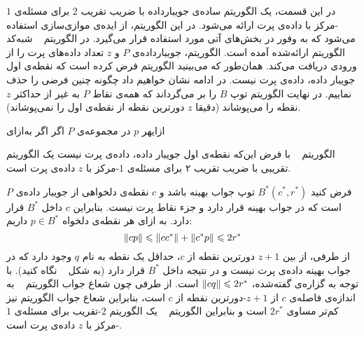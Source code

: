 
در این قسمت، یک الگوریتم ساده‌ی جویبارداده با ضریب تقریب $2$ برای مسئله‌ی $1$-مرکز با داده‌ی پرت ارائه می‌شود. در این الگوریتم، از ایده‌ی موازی‌سازی استفاده می‌شود که به وفور در بخش‌های آتی مورد استفاده قرار می‌گیرد. در الگوریتم ~ شبه‌کد الگوریتم ارائه‌شده آمده است. الگوریتم، جویبارداده‌ی $P$ و $z$ تعداد داده‌های پرت را از ورودی دریافت می‌کند. همان‌طور که می‌بینید الگوریتم فرض کرده است که نقطه‌ی اول جویبار داده، داده‌ی پرت نیست. در ادامه نشان خواهیم داد چگونه چنین فرضی را حذف نماییم. در نهایت الگوریتم توپ $B$ را بر می‌گرداند که همه‌ی نقاط $P$ به غیر از حداکثر $z$ نقطه را می‌پوشاند (دقیقا $z$ دورترین نقطه‌ از نقطه‌ی اول را نمی‌پوشاند).

‌ازای{هر $p$ در مجموعه‌ی $P$}
‌اگر
‌اگر
‌به‌ازای{}

الگوریتم  ~  با فرض این‌که نقطه‌ی اول جویبار داده، داده‌ی پرت نیست یک الگوریتم تقریبی با ضریب تقریب ۲ برای مسئله‌ی $1$-مرکز با $z$ داده‌ی پرت است.

فرض کنید $B^*(c^*, r^*)$ توپ جواب بهینه باشد و $c$ نقطه‌ی دلخواهی از جویبار داده‌ی $P$ است که در جواب بهینه قرار دارد و جزء نقاط پرت نیست. بنابراین $c$ داخل $B^*$ قرار دارد. به ازای هر نقطه‌ی دلخواه $p \in B^*$ داریم:
$$\|{cp}\| \leqslant \|{cc^*}\| + \|{c^*p}\| \leqslant 2r^*$$
از طرفی، از بین $z+1$ دورترین نقطه از $c$، حداقل یک نقطه به نام $q$ وجود دارد که در جواب بهینه داده‌ی پرت نیست و در نتیجه داخل $B^*$ قرار دارد (به شکل ~ نگاه کنید). با توجه به گزاره‌ی گفته‌شده، $\|{cq}\| \leqslant 2r^*$ است. از طرفی چون شعاع جواب الگوریتم ~ به اندازه‌ی فاصله‌ی $c$ از‌ $z+1$-دورترین نقطه‌ از $c$ است، بنابراین شعاع جواب الگوریتم نیز کم‌تر مساوی $2r^*$ است و بنابراین الگوریتم ~ یک الگوریتم $2$-تقریب برای مسئله‌ی $1$-مرکز با $z$ داده‌ی پرت است.

